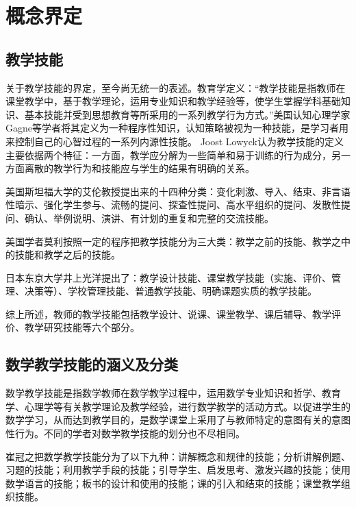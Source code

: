 \chapter{概念界定}

\section{教学技能}

关于教学技能的界定，至今尚无统一的表述。教育学定义：“教学技能是指教师在课堂教学中，基于教学理论，运用专业知识和教学经验等，使学生掌握学科基础知识、基本技能并受到思想教育等所采用的一系列教学行为方式\cite{谢尚果2012论师范生教学技能培养机制的创新}。”美国认知心理学家Gagne等学者将其定义为一种程序性知识，认知策略被视为一种技能，是学习者用来控制自己的心智过程的一系列内源性技能\cite{gagne1984learning}。 Joost Lowyck认为教学技能的定义主要依据两个特征：一方面，教学应分解为一些简单和易于训练的行为成分，另一方面离散的教学行为和技能应与学生的结果有明确的关系\cite{lowyck1980teaching}。

美国斯坦福大学的艾伦教授提出来的十四种分类：变化刺激、导入、结束、非言语性暗示、强化学生参与、流畅的提问、探查性提问、高水平组织的提问、发散性提问、确认、举例说明、演讲、有计划的重复和完整的交流技能\cite{董彦玲2012高师院校数学教师课堂教学技能微格训练研究}。

美国学者莫利按照一定的程序把教学技能分为三大类：教学之前的技能、教学之中的技能和教学之后的技能\cite{董彦玲2012高师院校数学教师课堂教学技能微格训练研究}。

日本东京大学井上光洋提出了：教学设计技能、课堂教学技能（实施、评价、管理、决策等）、学校管理技能、普通教学技能、明确课题实质的教学技能\cite{曹新数学教学技能学习教程}。

综上所述，教师的教学技能包括教学设计、说课、课堂教学、课后辅导、教学评价、教学研究技能等六个部分。



\section{数学教学技能的涵义及分类}

数学教学技能是指数学教师在数学教学过程中，运用数学专业知识和哲学、教育学、心理学等有关教学理论及教学经验，进行数学教学的活动方式。以促进学生的数学学习，从而达到教学目的，是数学课堂上采用了与教师特定的意图有关的意图性行为\cite{董彦玲2012高师院校数学教师课堂教学技能微格训练研究}。不同的学者对数学教学技能的划分也不尽相同。

崔冠之把数学教学技能分为了以下九种：讲解概念和规律的技能；分析讲解例题、习题的技能；利用教学手段的技能；引导学生、启发思考、激发兴趣的技能；使用数学语言的技能；板书的设计和使用的技能；课的引入和结束的技能；课堂教学组织技能\cite{崔冠之1995数学教学技能浅析}。

